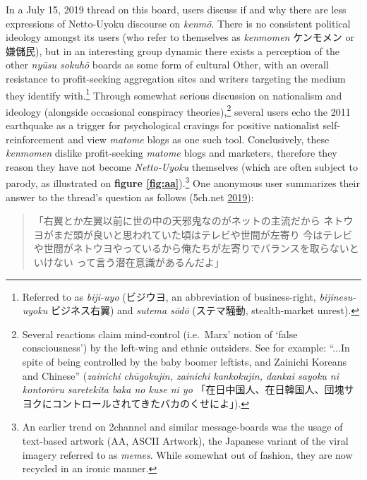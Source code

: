 \documentclass[10pt,british,A4paper,twoside]{memoir}
\begin{document}
In a July 15, 2019 thread on this board, users discuss if and why there
are less expressions of Netto-Uyoku discourse on \emph{kenmō}. There is
no consistent political ideology amongst its users (who refer to
themselves as \emph{kenmomen} ケンモメン or 嫌儲民), but in an
interesting group dynamic there exists a perception of the other \emph{nyūsu
sokuhō} boards as some form of cultural Other, with an overall resistance to
profit-seeking aggregation sites and writers targeting the medium they
identify with.\footnote{Referred to as \emph{biji-uyo} (ビジウヨ, an
  abbreviation of business-right, \emph{bijinesu-uyoku} ビジネス右翼)
  and \emph{sutema sōdō} (ステマ騒動, stealth-market unrest).} Through
somewhat serious discussion on nationalism and ideology (alongside
occasional conspiracy theories),\footnote{Several reactions claim
  mind-control (i.e.~Marx' notion of `false consciousness') by the
  left-wing and ethnic outsiders. See for example: ``...In spite of
  being controlled by the baby boomer leftists, and Zainichi Koreans and
  Chinese'' (\emph{zainichi chūgokujin, zainichi kankokujin, dankai
  sayoku ni kontorōru saretekita baka no kuse ni yo}
  「在日中国人、在日韓国人、団塊サヨクにコントロールされてきたバカのくせによ」).}
several users echo the 2011 earthquake as a trigger for psychological
cravings for positive nationalist self-reinforcement and view
\emph{matome} blogs as one such tool. Conclusively, these
\emph{kenmomen} dislike profit-seeking \emph{matome} blogs and
marketers, therefore they reason they have not become \emph{Netto-Uyoku}
themselves (which are often subject to parody, as illustrated on
\textbf{figure \ref{fig:aa}}).\footnote{An earlier trend on 2channel and
  similar message-boards was the usage of text-based artwork (AA, ASCII
  Artwork), the Japanese variant of the viral imagery referred to as
  \emph{memes}. While somewhat out of fashion, they are now recycled in
  an ironic manner.} One anonymous user summarizes their answer to the
thread's question as follows (5ch.net
\protect\hyperlink{ref-5ch.net_eng._2019}{2019}):

\begin{quote}
「右翼とか左翼以前に世の中の天邪鬼なのがネットの主流だから\newline
ネトウヨがまだ頭が良いと思われていた頃はテレビや世間が左寄り\newline
今はテレビや世間がネトウヨやっているから俺たちが左寄りでバランスを取らないといけない\newline
って言う潜在意識があるんだよ」
\end{quote}
\end{document}
